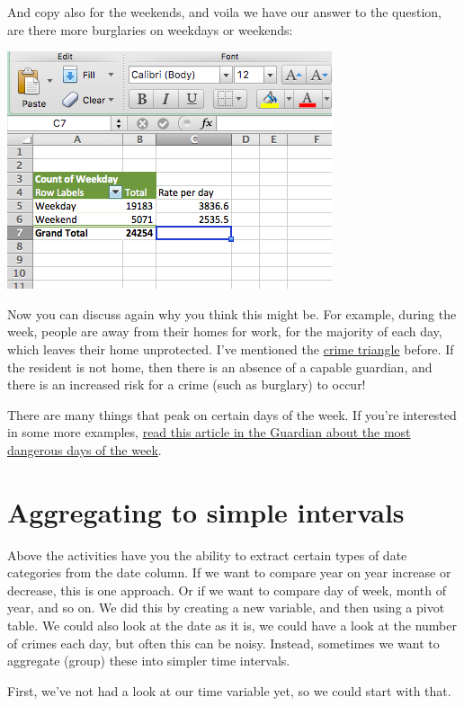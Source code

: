 \documentclass[]{book}
\theoremstyle{definition}
\theoremstyle{definition}
\theoremstyle{definition}
\theoremstyle{remark}
\begin{document}
And copy also for the weekends, and voila we have our answer to the
question, are there more burglaries on weekdays or weekends:

\includegraphics{imgs/burg_2.png}

Now you can discuss again why you think this might be. For example,
during the week, people are away from their homes for work, for the
majority of each day, which leaves their home unprotected. I've
mentioned the \href{}{crime triangle} before. If the resident is not
home, then there is an absence of a capable guardian, and there is an
increased risk for a crime (such as burglary) to occur!

There are many things that peak on certain days of the week. If you're
interested in some more examples,
\href{https://www.theguardian.com/lifeandstyle/2013/may/29/most-dangerous-day-of-week}{read
this article in the Guardian about the most dangerous days of the week}.

\hypertarget{aggregating-to-simple-intervals}{%
\section{Aggregating to simple
intervals}\label{aggregating-to-simple-intervals}}

Above the activities have you the ability to extract certain types of
date categories from the date column. If we want to compare year on year
increase or decrease, this is one approach. Or if we want to compare day
of week, month of year, and so on. We did this by creating a new
variable, and then using a pivot table. We could also look at the date
as it is, we could have a look at the number of crimes each day, but
often this can be noisy. Instead, sometimes we want to aggregate (group)
these into simpler time intervals.

First, we've not had a look at our time variable yet, so we could start
with that.
\end{document}
